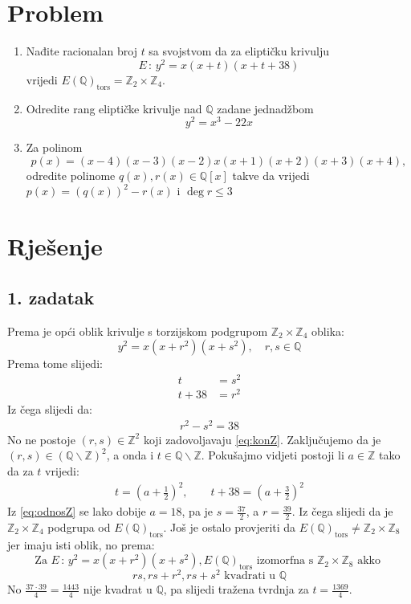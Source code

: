 \documentclass[12pt, a4paper]{article}
\begin{document}
\begin{spacing}{1.5}
\section{Problem}
\begin{enumerate}
\item Nađite racionalan broj $t$ sa svojstvom da za eliptičku krivulju 
\[E \, : \, y^2 =x(x+t)(x+t+38)\]
vrijedi $E(\mathbb{Q})_{\textrm{tors}}=\mathbb{Z}_2 \times \mathbb{Z}_4$.
\item Odredite rang eliptičke krivulje nad $\mathbb{Q}$ zadane jednadžbom
\[y^2=x^3-22x\]
\item Za polinom
\[p(x) = (x - 4)(x - 3)(x - 2)x(x + 1)(x + 2)(x + 3)(x + 4),\]
odredite polinome $q(x), r(x) \in \mathbb{Q}[x]$ takve da vrijedi $p(x)=(q(x))^2-r(x)$ i $\deg r \leq 3$
\end{enumerate}
\newpage
\section{Rješenje}
\subsection{1. zadatak}
Prema \cite[p.~28]{ekk} je opći oblik krivulje s torzijskom podgrupom $\mathbb{Z}_2 \times \mathbb{Z}_4$ oblika:
\begin{equation}
\label{eq:opciOblik}	
y^2=x(x+r^2)(x+s^2), \quad r,s \in \mathbb{Q}
\end{equation}
Prema tome slijedi:
\begin{align}
\label{eq:jdba1}
t &= s^2 \\
t+38 &= r^2
\end{align}
Iz čega slijedi da:
\begin{align}
\label{eq:konZ}
r^2-s^2=38
\end{align}
No ne postoje $(r,s) \in \mathbb{Z}^2$ koji zadovoljavaju \eqref{eq:konZ}. Zaključujemo da je $(r,s) \in (\mathbb{Q}\backslash \mathbb{Z})^2$, a onda i $t \in \mathbb{Q}\backslash\mathbb{Z}$.
Pokušajmo vidjeti postoji li $a \in \mathbb{Z}$ tako da za $t$ vrijedi:
\begin{align}
	\label{eq:odnosZ}
	t=\left(a+\frac{1}{2}\right)^2, \qquad	t+38=\left(a+\frac{3}{2}\right)^2
\end{align}
Iz \eqref{eq:odnosZ} se lako dobije $a=18$, pa je $s=\frac{37}{2}$, a $r=\frac{39}{2}$. Iz čega slijedi da je $\mathbb{Z}_2 \times \mathbb{Z}_4$ podgrupa od  $E(\mathbb{Q})_{\textrm{tors}}$. Još je ostalo provjeriti da $E(\mathbb{Q})_{\textrm{tors}} \neq \mathbb{Z}_2 \times \mathbb{Z}_8$ jer imaju isti oblik, no prema:
\[\textrm{Za } E \, : \, y^2=x(x+r^2)(x+s^2), E(\mathbb{Q})_{\textrm{tors}} \textrm{ izomorfna s } \mathbb{Z}_2 \times \mathbb{Z}_8 \textrm{ akko } \] 
\[rs, rs+r^2, rs+s^2 \textrm{ kvadrati u }\mathbb{Q} \]
No $\frac{37\cdot 39}{4}=\frac{1443}{4}$ nije kvadrat u $\mathbb{Q}$, pa slijedi tražena tvrdnja za $t=\frac{1369}{4}$.
\newpage

\end{spacing}
\end{document}

